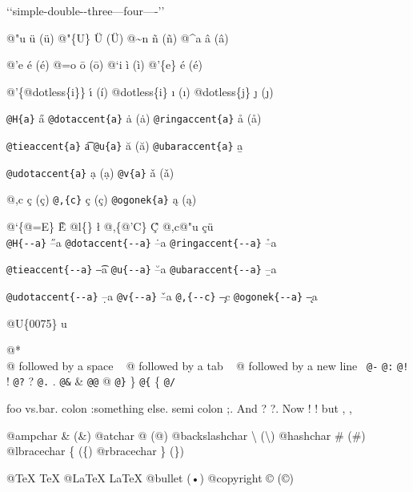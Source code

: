 \documentclass{book}
\renewcommand{\_}{\Texinfounderscore\discretionary{}{}{}}
\begin{document}
\begin{titlepage}
{`\hbox{}`simple-double-\hbox{}-three---four----'\hbox{}'\leavevmode{}\\

%
%
%
%

@"u \"{u} (ü)
@"\{U\} \"{U} (Ü) 
@\~{}n \~{n} (ñ)
@\^{}a \^{a} (â)

@'e \'{e} (é)
@=o \={o} (ō)
@`i \`{i} (ì)
@'\{e\} \'{e} (é)

@'\{@dotless\{i\}\} \'{\i{}} (í)
@dotless\{i\} \i{} (ı)
@dotless\{j\} \j{} (ȷ)

\texttt{@H\{a\}} \H{a}
\texttt{@dotaccent\{a\}} \.{a} (ȧ)
\texttt{@ringaccent\{a\}} \r{a} (å)

\texttt{@tieaccent\{a\}} \t{a}
\texttt{@u\{a\}} \u{a} (ă)
\texttt{@ubaraccent\{a\}} \b{a}

\texttt{@udotaccent\{a\}} \d{a} (ạ)
\texttt{@v\{a\}} \v{a} (ǎ)

@,c \c{c} (ç)
\texttt{@,\{c\}} \c{c} (ç)
\texttt{@ogonek\{a\}} \k{a} (ą)

@`\{@=E\} \`{\={E}}
@l\{\} \l{}
@,\{@'C\} \c{\'{C}}
@,c@"u \c{c}\"{u} \leavevmode{}\\

\texttt{@H\{{-}{-}a\}} \H{--a}
\texttt{@dotaccent\{{-}{-}a\}} \.{--a}
\texttt{@ringaccent\{{-}{-}a\}} \r{--a}

\texttt{@tieaccent\{{-}{-}a\}} \t{--a}
\texttt{@u\{{-}{-}a\}} \u{--a}
\texttt{@ubaraccent\{{-}{-}a\}} \b{--a}

\texttt{@udotaccent\{{-}{-}a\}} \d{--a}
\texttt{@v\{{-}{-}a\}} \v{--a}
\texttt{@,\{{-}{-}c\}} \c{--c}
\texttt{@ogonek\{{-}{-}a\}} \k{--a}

@U\{0075\} u

@* \leavevmode{}\\
@ followed by a space
\ {}
@ followed by a tab
\ {}
@ followed by a new line
\ {}\texttt{@-} \-{}
\texttt{@:} \@
\texttt{@!} \@!
\texttt{@?} \@?
\texttt{@.} \@.
\texttt{@\&} \&
\texttt{@@} @
\texttt{@\}} \}
\texttt{@\{} \{
\texttt{@/} 

foo vs.\@ bar. 
colon :\@And something else.
semi colon ;\@.
And ? ?\@.
Now ! !\@@
but , ,\@

@ampchar \& (\&)
@atchar @ (@)
@backslashchar \textbackslash{} (\textbackslash{})
@hashchar \# (\#)
@lbracechar \{ (\{)
@rbracechar \} (\})

@TeX \TeX{}
@LaTeX \LaTeX{}
@bullet \textbullet{} (•)
@copyright \copyright{} (©)

}
\end{titlepage}
\end{document}
